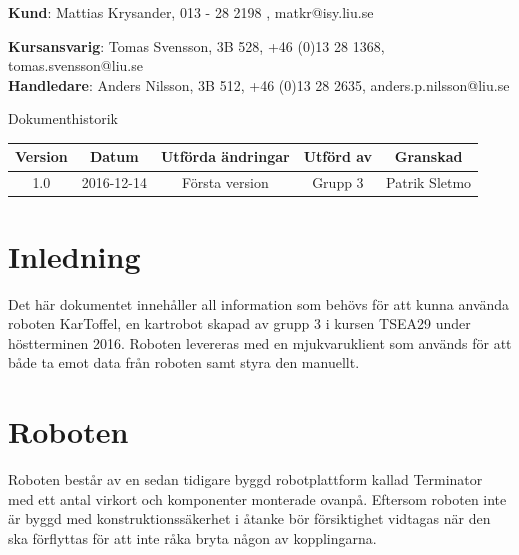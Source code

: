 \documentclass{article}
\begin{document}
\begin{center}
\textbf{Kund}: Mattias Krysander, 013 - 28 2198 , matkr@isy.liu.se
\end{center}

\begin{center}
\textbf{Kursansvarig}: Tomas Svensson, 3B 528, +46 (0)13 28 1368, tomas.svensson@liu.se \\
\textbf{Handledare}: Anders Nilsson, 3B 512, +46 (0)13 28 2635, anders.p.nilsson@liu.se
\end{center}
\vspace*{\fill}
\clearpage

\renewcommand*\contentsname{Innehållsförteckning}
\tableofcontents
\clearpage


{
\sffamily
\centering
\large


{\huge 
Dokumenthistorik \\
}
\begin{table}[H]
\centering
\begin{tabular}{ | c | c | c | c | c |} 
\hline
\textbf{Version} & \textbf{Datum} & \textbf{Utförda ändringar} & \textbf{Utförd av } & \textbf{Granskad} \\
\hline
1.0 & 2016-12-14 & Första version & Grupp 3 & Patrik Sletmo \\
\hline

\end{tabular}
\end{table}
}

\clearpage
\section{Inledning}
Det här dokumentet innehåller all information som behövs för att kunna använda roboten KarToffel, en kartrobot skapad av grupp 3 i kursen TSEA29 under höstterminen 2016. Roboten levereras med en mjukvaruklient som används för att både ta emot data från roboten samt styra den manuellt. 


\clearpage
\section{Roboten}
Roboten består av en sedan tidigare byggd robotplattform kallad Terminator med ett antal virkort och komponenter monterade ovanpå. Eftersom roboten inte är byggd med konstruktionssäkerhet i åtanke bör försiktighet vidtagas när den ska förflyttas för att inte råka bryta någon av kopplingarna.
\end{document}
